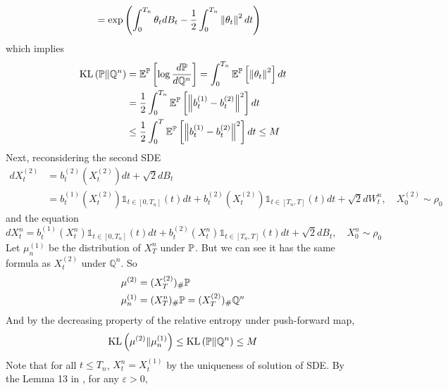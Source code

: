 \documentclass[a4paper,12pt]{article}
\begin{document}
\begin{enumerate}[label=(\arabic*)]
\begin{rmk}
\begin{equation*}
\begin{aligned}
        &= \exp \left(\int_0^{T_n} \theta_td B_t-\frac{1}{2} \int_0^{T_n} \left\lVert\theta_t\right\lVert^2d t\right)
      \end{aligned}
    \end{equation*}
    which implies
    \begin{equation*}
      \begin{aligned}
        \operatorname{KL}\left(\mathbb{P} \Vert\mathbb{Q}^n\right) &= \mathbb{E}^{\mathbb{P}}\left[\log \frac{d\mathbb{P}}{d\mathbb{Q}^n}\right] = \int_0^{T_n} \mathbb{E}^{\mathbb{P}}\left[\left\lVert\theta_t\right\lVert^2\right]dt\\
        &= \frac{1}{2}\int_0^{T_n} \mathbb{E}^{\mathbb{P}}\left[\left\lVert b_t^{(1)}-b_t^{(2)}\right\lVert^2\right]dt \\
        &\leq \frac{1}{2}\int_0^{T} \mathbb{E}^{\mathbb{P}}\left[\left\lVert b_t^{(1)}-b_t^{(2)}\right\lVert^2\right]dt \leq M
      \end{aligned}
    \end{equation*}
    Next, reconsidering the second SDE
    \begin{equation*}
      \begin{aligned}
        d X_t^{(2)}&=b_t^{(2)}(X_t^{(2)}) d t+\sqrt{2} d B_t \\
        &=b_t^{(1)}(X_t^{(2)})\mathds{1}_{t \in [0,T_n]}(t)dt + b_t^{(2)}(X_t^{(2)})\mathds{1}_{t \in [T_n,T]}(t)dt + \sqrt{2} d W^n_t,\quad X_0^{(2)} \sim \rho_0
      \end{aligned}
    \end{equation*}
    and the equation
    \begin{equation*}
      d X_t^n = b_t^{(1)}(X_t^n)\mathds{1}_{t \in [0,T_n]}(t)dt + b_t^{(2)}(X_t^n)\mathds{1}_{t \in [T_n,T]}(t)dt + \sqrt{2} d B_t,\quad X_0^n \sim \rho_0
    \end{equation*}
    Let $\mu^{(1)}_n$ be the distribution of $X_T^n$ under $\mathbb{P}$. But we can see it has the same formula as $X_t^{(2)}$ under $\mathbb{Q}^n$. So
    \begin{equation*}
      \begin{aligned}
        \mu^{(2)} & = (X_T^{(2)})_{\#}\mathbb{P} \\
        \mu^{(1)}_n &= (X_T^n)_{\#}\mathbb{P} = (X_T^{(2)})_{\#}\mathbb{Q}^n
      \end{aligned}
    \end{equation*}
    And by the decreasing property of the relative entropy under push-forward map,
    \begin{equation*}
      \operatorname{KL}\left(\mu^{(2)} \Vert \mu^{(1)}_n\right) \leq \operatorname{KL}\left(\mathbb{P} \Vert \mathbb{Q}^n\right) \leq M
    \end{equation*}
    Note that for all $t \leq T_n$, $X_t^n = X_t^{(1)}$ by the uniqueness of solution of SDE. By the Lemma 13 in \cite{chen2023sampling}, for any $\varepsilon > 0$,

\end{rmk}
\end{enumerate}
\end{document}
